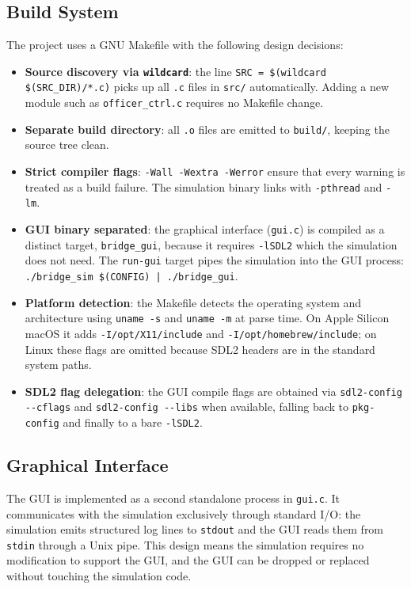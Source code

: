 \documentclass[12pt]{article}
\begin{document}
\subsection{Build System}

The project uses a GNU Makefile with the following design decisions:

\begin{itemize}
  \item \textbf{Source discovery via \texttt{wildcard}}: the line
    \texttt{SRC = \$(wildcard \$(SRC\_DIR)/*.c)} picks up all \texttt{.c}
    files in \texttt{src/} automatically. Adding a new module such as
    \texttt{officer\_ctrl.c} requires no Makefile change.
  \item \textbf{Separate build directory}: all \texttt{.o} files are emitted
    to \texttt{build/}, keeping the source tree clean.
  \item \textbf{Strict compiler flags}: \texttt{-Wall -Wextra -Werror}
    ensure that every warning is treated as a build failure. The simulation
    binary links with \texttt{-pthread} and \texttt{-lm}.
  \item \textbf{GUI binary separated}: the graphical interface (\texttt{gui.c})
    is compiled as a distinct target, \texttt{bridge\_gui}, because it
    requires \texttt{-lSDL2} which the simulation does not need. The
    \texttt{run-gui} target pipes the simulation into the GUI process:
    \texttt{./bridge\_sim \$(CONFIG) | ./bridge\_gui}.
  \item \textbf{Platform detection}: the Makefile detects the operating
    system and architecture using \texttt{uname -s} and \texttt{uname -m}
    at parse time. On Apple Silicon macOS it adds \texttt{-I/opt/X11/include}
    and \texttt{-I/opt/homebrew/include}; on Linux these flags are omitted
    because SDL2 headers are in the standard system paths.
  \item \textbf{SDL2 flag delegation}: the GUI compile flags are obtained
    via \texttt{sdl2-config -{}-cflags} and \texttt{sdl2-config -{}-libs}
    when available, falling back to \texttt{pkg-config} and finally to a
    bare \texttt{-lSDL2}.
\end{itemize}

\subsection{Graphical Interface}

The GUI is implemented as a second standalone process in \texttt{gui.c}.
It communicates with the simulation exclusively through standard I/O: the
simulation emits structured log lines to \texttt{stdout} and the GUI reads
them from \texttt{stdin} through a Unix pipe. This design means the
simulation requires no modification to support the GUI, and the GUI can be
dropped or replaced without touching the simulation code.
\end{document}

